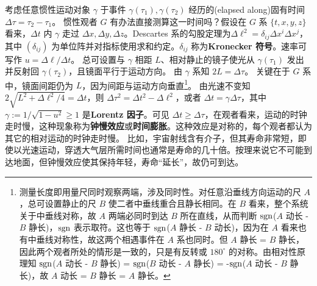 考虑任意惯性运动对象 $\gamma$ 于事件 $\gamma(\tau_1),\gamma(\tau_2)$ 经历的(elapsed along)固有时间 $\Delta\tau=\tau_2-\tau_1$。
惯性观者 $G$ 有办法直接测算这一时间吗？假设在 $G$ 系 $\{t,x,y,z\}$ 看来，$\Delta t$ 内 $\gamma$ 走过 $\Delta x,\Delta y,\Delta z$。Descartes 系的勾股定理为$\Delta\ell^2=\delta_{ij}\Delta x^i\Delta x^j$，其中 $(\delta_{ij})$ 为单位阵并对指标使用求和约定。$\delta_{ij}$ 称为\textbf{Kronecker 符号}。速率可写作 $u=\Delta\ell/\Delta t$。
总可设置与 $\gamma$ 相距 $L$、相对静止的镜子使光从 $\gamma(\tau_1)$ 发出并反射回 $\gamma(\tau_2)$，且镜面平行于运动方向。
由 $\gamma$ 系知 $2L=\Delta\tau$。
关键在于 $G$ 系中，镜面间距仍为 $L$，因为间距与运动方向垂直\footnote{测量长度即用量尺同时观察两端，涉及同时性。对任意沿垂线方向运动的尺 $A$，总可设置静止的尺 $B$ 使二者中垂线重合且静长相同。在 $B$ 看来，整个系统关于中垂线对称，故 $A$ 两端必同时到达 $B$ 所在直线，从而判断 $\operatorname{sgn}$($A$ 动长 - $B$ 静长)，$\operatorname{sgn}$ 表示取符。这也等于 $\operatorname{sgn}$($A$ 静长 - $B$ 动长)，因为在 $A$ 看来也有中垂线对称性，故这两个相遇事件在 $A$ 系也同时。但 $A$ 静长 = $B$ 静长，因此两个观者所处的情形是一致的，只是有反转或 $180^\circ$ 的对称。由相对性原理知 $\operatorname{sgn}$($A$ 动长 - $B$ 静长) = $\operatorname{sgn}$($B$ 动长 - $A$ 静长) = -$\operatorname{sgn}$($A$ 动长 - $B$ 静长)，故 $A$ 动长 = $B$ 静长 = $A$ 静长。}。
由光速不变知 $2\sqrt{L^2+\Delta\ell^2/4}=\Delta t$，则 $\Delta\tau^2=\Delta t^2-\Delta\ell^2$，或者 $\Delta t=\gamma\Delta\tau$，其中 $\gamma:=1/\sqrt{1-u^2}\geqslant 1$ 是\textbf{Lorentz 因子}。可见 $\Delta t\geqslant\Delta\tau$，在观者看来，运动的时钟走时慢，这种现象称为\textbf{钟慢效应}或\textbf{时间膨胀}。这种效应是对称的，每个观者都认为其它的相对运动的时钟走时慢。
比如，宇宙射线含有介子，但其寿命非常短，即使以光速运动，穿透大气层所需时间也通常是寿命的几十倍。按理来说它不可能到达地面，但钟慢效应使其保持年轻，寿命“延长”，故仍可到达。

